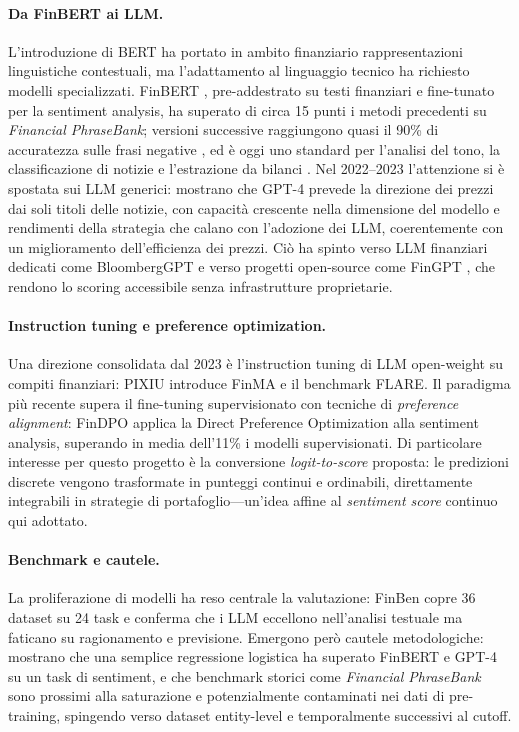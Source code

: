 \documentclass[a4paper,11pt]{article}
\begin{document}
\paragraph{Da FinBERT ai LLM.} L'introduzione di BERT \parencite{devlin2018bert} ha portato in ambito finanziario rappresentazioni linguistiche contestuali, ma l'adattamento al linguaggio tecnico ha richiesto modelli specializzati. FinBERT \parencite{araci2019finbert}, pre-addestrato su testi finanziari e fine-tunato per la sentiment analysis, ha superato di circa 15 punti i metodi precedenti su \textit{Financial PhraseBank}; versioni successive raggiungono quasi il 90\% di accuratezza sulle frasi negative \parencite{huang2022finbert}, ed è oggi uno standard per l'analisi del tono, la classificazione di notizie e l'estrazione da bilanci \parencite{gu2024finbert}. Nel 2022--2023 l'attenzione si è spostata sui LLM generici: \textcite{lopezlira2024chatgptforecaststockprice} mostrano che GPT-4 prevede la direzione dei prezzi dai soli titoli delle notizie, con capacità crescente nella dimensione del modello e rendimenti della strategia che calano con l'adozione dei LLM, coerentemente con un miglioramento dell'efficienza dei prezzi. Ciò ha spinto verso LLM finanziari dedicati come BloombergGPT \parencite{wu2023bloomberggptlargelanguagemodel} e verso progetti open-source come FinGPT \parencite{yang2023fingptopensourcefinanciallarge}, che rendono lo scoring accessibile senza infrastrutture proprietarie.

\paragraph{Instruction tuning e preference optimization.} Una direzione consolidata dal 2023 è l'instruction tuning di LLM open-weight su compiti finanziari: PIXIU \parencite{xie2023pixiu} introduce FinMA e il benchmark FLARE. Il paradigma più recente supera il fine-tuning supervisionato con tecniche di \textit{preference alignment}: FinDPO \parencite{iacovides2025findpo} applica la Direct Preference Optimization alla sentiment analysis, superando in media dell'11\% i modelli supervisionati. Di particolare interesse per questo progetto è la conversione \textit{logit-to-score} proposta: le predizioni discrete vengono trasformate in punteggi continui e ordinabili, direttamente integrabili in strategie di portafoglio---un'idea affine al \textit{sentiment score} continuo qui adottato.

\paragraph{Benchmark e cautele.} La proliferazione di modelli ha reso centrale la valutazione: FinBen \parencite{xie2024finben} copre 36 dataset su 24 task e conferma che i LLM eccellono nell'analisi testuale ma faticano su ragionamento e previsione. Emergono però cautele metodologiche: \textcite{bdcc8110143} mostrano che una semplice regressione logistica ha superato FinBERT e GPT-4 su un task di sentiment, e che benchmark storici come \textit{Financial PhraseBank} sono prossimi alla saturazione e potenzialmente contaminati nei dati di pre-training, spingendo verso dataset entity-level \parencite{tang-etal-2023-finentity} e temporalmente successivi al cutoff.
\end{document}
